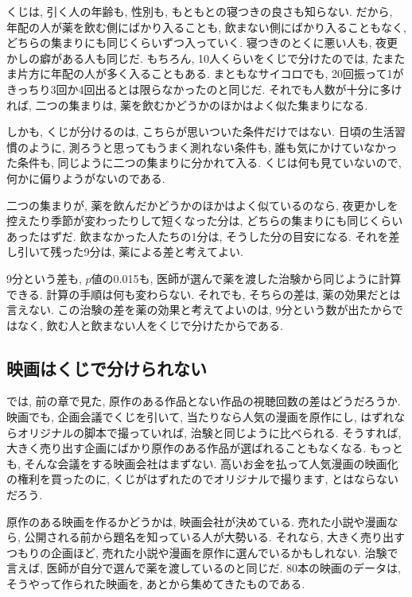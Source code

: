    くじは, 引く人の年齢も, 性別も, もともとの寝つきの良さも知らない.
    だから, 年配の人が薬を飲む側にばかり入ることも, 飲まない側にばかり入ることもなく, どちらの集まりにも同じくらいずつ入っていく.
    寝つきのとくに悪い人も, 夜更かしの癖がある人も同じだ.
    もちろん, 10人くらいをくじで分けたのでは, たまたま片方に年配の人が多く入ることもある.
    まともなサイコロでも, 20回振って1がきっちり3回か4回出るとは限らなかったのと同じだ.
    それでも人数が十分に多ければ, 二つの集まりは, 薬を飲むかどうかのほかはよく似た集まりになる.

    しかも, くじが分けるのは, こちらが思いついた条件だけではない.
    日頃の生活習慣のように, 測ろうと思ってもうまく測れない条件も, 誰も気にかけていなかった条件も, 同じように二つの集まりに分かれて入る.
    くじは何も見ていないので, 何かに偏りようがないのである.

    二つの集まりが, 薬を飲んだかどうかのほかはよく似ているのなら, 夜更かしを控えたり季節が変わったりして短くなった分は, どちらの集まりにも同じくらいあったはずだ.
    飲まなかった人たちの1分は, そうした分の目安になる.
    それを差し引いて残った9分は, 薬による差と考えてよい.

    9分という差も, $p$値の0.015も, 医師が選んで薬を渡した治験から同じように計算できる.
    計算の手順は何も変わらない.
    それでも, そちらの差は, 薬の効果だとは言えない.
    この治験の差を薬の効果と考えてよいのは, 9分という数が出たからではなく, 飲む人と飲まない人をくじで分けたからである.

  \subsection{映画はくじで分けられない}

    では, 前の章で見た, 原作のある作品とない作品の視聴回数の差はどうだろうか.
    映画でも, 企画会議でくじを引いて, 当たりなら人気の漫画を原作にし, はずれならオリジナルの脚本で撮っていれば, 治験と同じように比べられる.
    そうすれば, 大きく売り出す企画にばかり原作のある作品が選ばれることもなくなる.
    もっとも, そんな会議をする映画会社はまずない.
    高いお金を払って人気漫画の映画化の権利を買ったのに, くじがはずれたのでオリジナルで撮ります, とはならないだろう.

    原作のある映画を作るかどうかは, 映画会社が決めている.
    売れた小説や漫画なら, 公開される前から題名を知っている人が大勢いる.
    それなら, 大きく売り出すつもりの企画ほど, 売れた小説や漫画を原作に選んでいるかもしれない.
    治験で言えば, 医師が自分で選んで薬を渡しているのと同じだ.
    80本の映画のデータは, そうやって作られた映画を, あとから集めてきたものである.

